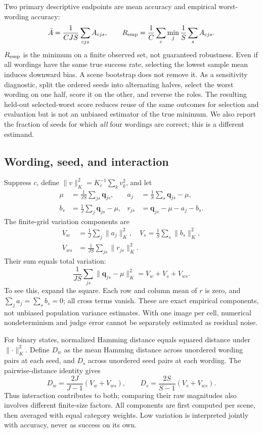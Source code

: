 \documentclass[10pt,letterpaper]{article}
\newcommand{\q}{\boldsymbol{q}}
\newcommand{\normk}[1]{\lVert #1\rVert_K^2}
\begin{document}
Two primary descriptive endpoints are mean accuracy and empirical worst-wording accuracy:
\begin{equation}
 \bar A=\frac{1}{CJS}\sum_{cjs}A_{cjs},\qquad
 R_{\rm emp}=\frac1C\sum_c\min_j\frac1S\sum_s A_{cjs}.
\end{equation}
$R_{\rm emp}$ is the minimum on a finite observed set, not guaranteed robustness. Even if all wordings have the same true success rate, selecting the lowest sample mean induces downward bias. A scene bootstrap does not remove it. As a sensitivity diagnostic, split the ordered seeds into alternating halves, select the worst wording on one half, score it on the other, and reverse the roles. The resulting held-out selected-worst score reduces reuse of the same outcomes for selection and evaluation but is not an unbiased estimator of the true minimum. We also report the fraction of seeds for which \emph{all} four wordings are correct; this is a different estimand.

\subsection{Wording, seed, and interaction}
Suppress $c$, define $\normk{v}=K_c^{-1}\sum_k v_k^2$, and let
\begin{align}
 \mu&=\frac1{JS}\sum_{js}\q_{js},&
 a_j&=\frac1S\sum_s\q_{js}-\mu,\nonumber\\
 b_s&=\frac1J\sum_j\q_{js}-\mu,&
 r_{js}&=\q_{js}-\mu-a_j-b_s.
\end{align}
The finite-grid variation components are
\begin{align}
 V_w&=\frac1J\sum_j\normk{a_j},\quad
 V_s=\frac1S\sum_s\normk{b_s},\nonumber\\
 V_{ws}&=\frac1{JS}\sum_{js}\normk{r_{js}}.
\end{align}
Their sum equals total variation:
\begin{equation}
 \frac1{JS}\sum_{js}\normk{\q_{js}-\mu}=V_w+V_s+V_{ws}.
 \label{eq:partition}
\end{equation}
To see this, expand the square. Each row and column mean of $r$ is zero, and $\sum_j a_j=\sum_s b_s=0$; all cross terms vanish. These are exact empirical components, not unbiased population variance estimates. With one image per cell, numerical nondeterminism and judge error cannot be separately estimated as residual noise.

For binary states, normalized Hamming distance equals squared distance under $\normk{\cdot}$. Define $D_w$ as the mean Hamming distance across unordered wording pairs at each seed, and $D_s$ across unordered seed pairs at each wording. The pairwise-distance identity gives
\begin{equation}
 D_w=\frac{2J}{J-1}(V_w+V_{ws}),\qquad
 D_s=\frac{2S}{S-1}(V_s+V_{ws}).
 \label{eq:disagreement}
\end{equation}
Thus interaction contributes to both; comparing their raw magnitudes also involves different finite-size factors. All components are first computed per scene, then averaged with equal category weights. Low variation is interpreted jointly with accuracy, never as success on its own.
\end{document}
